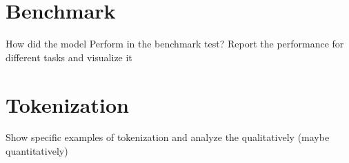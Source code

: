 \section{Benchmark}
\label{sec:benchmark}
How did the model Perform in the benchmark test? Report the performance for different tasks and visualize it

\section{Tokenization}
\label{sec:tokenization}
Show specific examples of tokenization and analyze the qualitatively (maybe quantitatively)